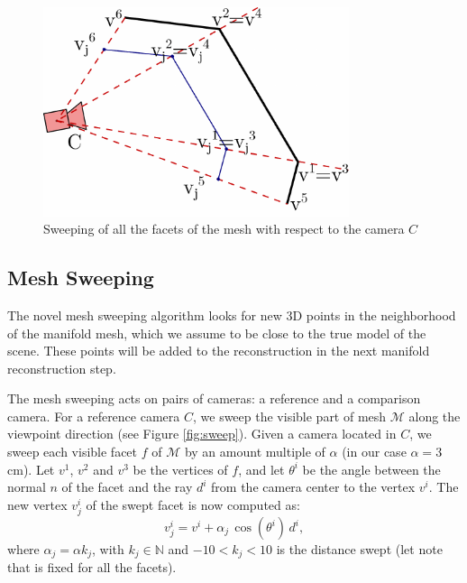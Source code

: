 \begin{figure}[tp]
  \centering
  \includegraphics[width=0.8\textwidth]{./img/ch-sweep/sweepMulti.pdf}
  \caption{Sweeping of all the facets of the mesh with respect to the camera $C$}
  \label{fig:sweepMulti}
\end{figure}


 

\subsection{Mesh Sweeping}
\label{sec:sweep}
The novel mesh sweeping algorithm looks for new 3D points in the neighborhood of the manifold mesh, which we assume to be close to the true model of the scene.
These points will be added to the reconstruction in the next manifold reconstruction step.

The mesh sweeping acts on pairs of cameras: a reference  and a comparison camera. 
For a reference camera $C$, we sweep the visible part of mesh $\mathcal{M}$ along the viewpoint direction (see Figure \ref{fig:sweep}). 
Given a camera located in $C$, we sweep each visible facet $f$ of $\mathcal{M}$ by an amount multiple of $\alpha$ (in our case $\alpha = 3$cm).
Let $v^1$, $v^2$ and $v^3$ be the vertices of $f$, and let $\theta^i$ be the angle between the normal $n$ of the facet and the ray $d^i$ from the camera center to the vertex $v^i$. 
The new vertex $v_j^i$ of the swept facet is now computed as:
\begin{equation}
v_j^i = v^i + \alpha_j \, \cos (\theta^i) \, d^i,
\end{equation}
where $\alpha_j = \alpha  k_j$, with $k_j \in \mathbb{N}$ and $-10< k_j <10$ is the distance swept (let note that is fixed for all the facets).

